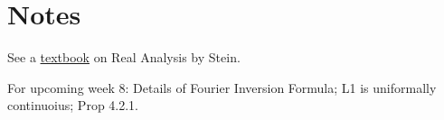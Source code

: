 \section{Notes}

See a \href{http://home.ustc.edu.cn/~matchbox/Real%20Analysis%20Stein.pdf}{textbook} on Real Analysis by Stein.

For upcoming week 8: 
Details of Fourier Inversion Formula;
L1 is uniformally continuoius;
Prop 4.2.1.